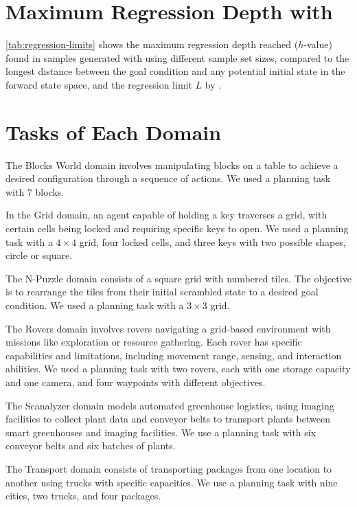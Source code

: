 \documentclass[ppgc,diss,english]{iiufrgs}
\begin{document}
\appendix

\chapter{Maximum Regression Depth with \bfsrs}
\label{cha:max_reg_depth}

\cref{tab:regression-limits} shows the maximum regression depth reached ($h$-value) found in samples generated with \bfsrs using different sample set sizes, compared to the longest distance \distfarthest between the goal condition and any potential initial state in the forward state space, and the regression limit $L$ by \citet{Bettker.etal/2022}.



\chapter{Tasks of Each Domain}
\label{cha:tasks_each_domain}
The Blocks World domain involves manipulating blocks on a table to achieve a desired configuration through a sequence of actions. We used a planning task with $7$ blocks.

In the Grid domain, an agent capable of holding a key traverses a grid, with certain cells being locked and requiring specific keys to open. We used a planning task with a $4 \times 4$ grid, four locked cells, and three keys with two possible shapes, circle or square.

The N-Puzzle domain consists of a square grid with numbered tiles. The objective is to rearrange the tiles from their initial scrambled state to a desired goal condition. We used a planning task with a $3 \times 3$ grid.

The Rovers domain involves rovers navigating a grid-based environment with missions like exploration or resource gathering. Each rover has specific capabilities and limitations, including movement range, sensing, and interaction abilities. We used a planning task with two rovers, each with one storage capacity and one camera, and four waypoints with different objectives.

The Scanalyzer domain models automated greenhouse logistics, using imaging facilities to collect plant data and conveyor belts to transport plants between smart greenhouses and imaging facilities. We use a planning task with six conveyor belts and six batches of plants.

The Transport domain consists of transporting packages from one location to another using trucks with specific capacities. We use a planning task with nine cities, two trucks, and four packages.
\end{document}
